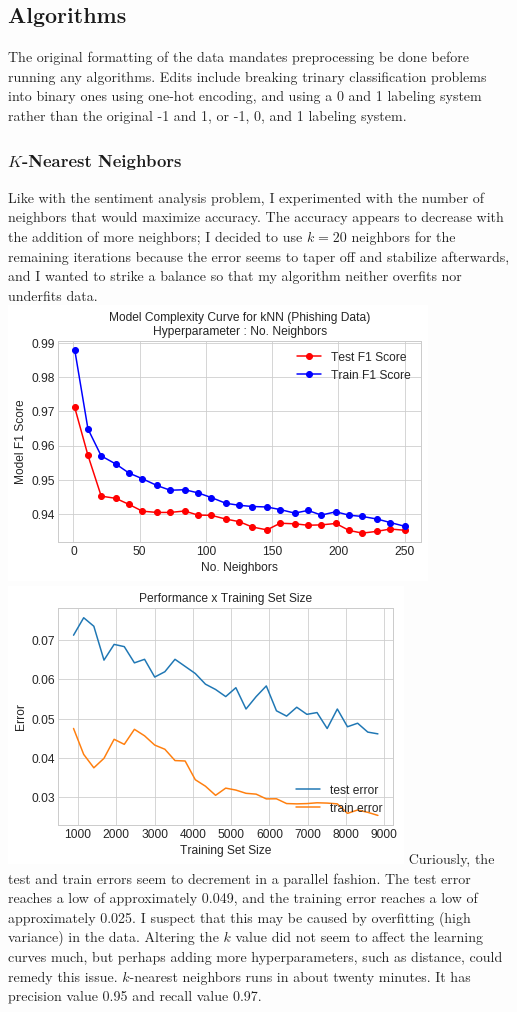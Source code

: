 \documentclass[11pt, a4paper]{article} %
\begin{document}
\subsection{Algorithms}
The original formatting of the data mandates preprocessing be done before running any algorithms. Edits include breaking trinary classification problems into binary ones using one-hot encoding, and using a 0 and 1 labeling system rather than the original -1 and 1, or -1, 0, and 1 labeling system.
\subsubsection{$K$-Nearest Neighbors}
Like with the sentiment analysis problem, I experimented with the number of neighbors that would maximize accuracy. The accuracy appears to decrease with the addition of more neighbors; I decided to use $k=20$ neighbors for the remaining iterations because the error seems to taper off and stabilize afterwards, and I wanted to strike a balance so that my algorithm neither overfits nor underfits data.
\newline\newline
\includegraphics[scale=0.55]{kNN_Model_Complexity.png}
\includegraphics[scale=0.55]{kNN_LC.png}
\newline\newline
Curiously, the test and train errors seem to decrement in a parallel fashion. The test error reaches a low of approximately 0.049, and the training error reaches a low of approximately 0.025. I suspect that this may be caused by overfitting (high variance) in the data. Altering the $k$ value did not seem to affect the learning curves much, but perhaps adding more hyperparameters, such as distance, could remedy this issue. $k$-nearest neighbors runs in about twenty minutes. It has precision value 0.95 and recall value 0.97.
\end{document}
